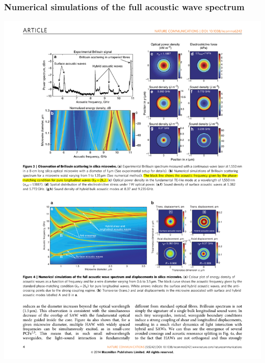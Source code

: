 \documentclass{beamer}
\begin{document}
\begin{frame}
\frametitle{Numerical simulations of the full acoustic wave spectrum}
\begin{center}
\includegraphics[width=1.0\columnwidth]{f4.pdf}
\end{center}
\end{frame}
\end{document}
